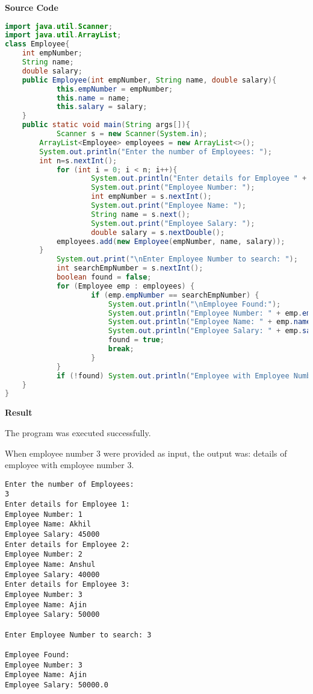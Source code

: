 \vspace{0.5cm}
\textbf{Source Code}
\begin{lstlisting}[language=Java]
import java.util.Scanner;
import java.util.ArrayList;
class Employee{
	int empNumber;
	String name;
	double salary;
	public Employee(int empNumber, String name, double salary){
        	this.empNumber = empNumber;
        	this.name = name;
        	this.salary = salary;
	}
	public static void main(String args[]){
	       	Scanner s = new Scanner(System.in);
		ArrayList<Employee> employees = new ArrayList<>();
		System.out.println("Enter the number of Employees: ");
		int n=s.nextInt();
        	for (int i = 0; i < n; i++){
            		System.out.println("Enter details for Employee " + (i + 1) + ":");
            		System.out.print("Employee Number: ");
            		int empNumber = s.nextInt();
            		System.out.print("Employee Name: ");
            		String name = s.next();
            		System.out.print("Employee Salary: ");
            		double salary = s.nextDouble();
			employees.add(new Employee(empNumber, name, salary));
		}
        	System.out.print("\nEnter Employee Number to search: ");
        	int searchEmpNumber = s.nextInt();
        	boolean found = false;
        	for (Employee emp : employees) {
            		if (emp.empNumber == searchEmpNumber) {
                		System.out.println("\nEmployee Found:");
                		System.out.println("Employee Number: " + emp.empNumber);
                		System.out.println("Employee Name: " + emp.name);
                		System.out.println("Employee Salary: " + emp.salary);
                		found = true;
                		break;
            		}
        	}
        	if (!found) System.out.println("Employee with Employee Number " + searchEmpNumber + " not found.");
    }
}
\end{lstlisting}

\vspace{0.5cm}
\textbf{Result}
\vspace{0.5cm}

The program was executed successfully. 

When employee number 3 were provided as input, the output was: details of employee with employee number 3.
\begin{verbatim}
Enter the number of Employees: 
3
Enter details for Employee 1:
Employee Number: 1
Employee Name: Akhil
Employee Salary: 45000
Enter details for Employee 2:
Employee Number: 2
Employee Name: Anshul
Employee Salary: 40000
Enter details for Employee 3:
Employee Number: 3
Employee Name: Ajin
Employee Salary: 50000

Enter Employee Number to search: 3

Employee Found:
Employee Number: 3
Employee Name: Ajin
Employee Salary: 50000.0
\end{verbatim}

